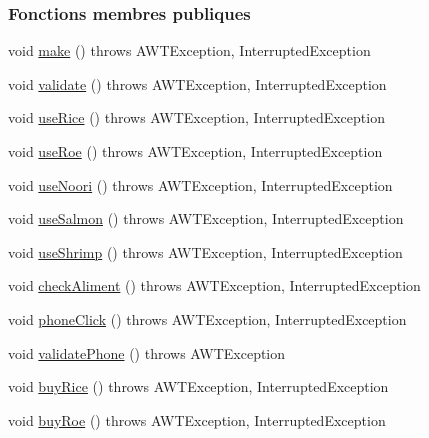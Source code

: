 \subsubsection*{Fonctions membres publiques}
\begin{DoxyCompactItemize}
\item 
void \hyperlink{classTestSushi_1_1src_1_1Suchi_1_1Salmon_a022a353afb47ca70372948b41988f10b}{make} ()  throws A\+W\+T\+Exception, Interrupted\+Exception
\item 
void \hyperlink{classTestSushi_1_1src_1_1Suchi_1_1Salmon_a391e4929873a71380ea6cdbda907190a}{validate} ()  throws A\+W\+T\+Exception, Interrupted\+Exception 
\item 
void \hyperlink{classTestSushi_1_1src_1_1Suchi_1_1Recette_a2d78a4575d1295e34210e2f77c01f3f3}{use\+Rice} ()  throws A\+W\+T\+Exception, Interrupted\+Exception
\item 
void \hyperlink{classTestSushi_1_1src_1_1Suchi_1_1Recette_a8967a205e78d02ef7c30fd435fbaa0af}{use\+Roe} ()  throws A\+W\+T\+Exception, Interrupted\+Exception
\item 
void \hyperlink{classTestSushi_1_1src_1_1Suchi_1_1Recette_a10bfe3c71750c84144203a7aa2c341ee}{use\+Noori} ()  throws A\+W\+T\+Exception, Interrupted\+Exception
\item 
void \hyperlink{classTestSushi_1_1src_1_1Suchi_1_1Recette_a87cd9338767df0e5db88e6005f1da984}{use\+Salmon} ()  throws A\+W\+T\+Exception, Interrupted\+Exception
\item 
void \hyperlink{classTestSushi_1_1src_1_1Suchi_1_1Recette_ab2c165554830ba84a392765621604d44}{use\+Shrimp} ()  throws A\+W\+T\+Exception, Interrupted\+Exception
\item 
void \hyperlink{classTestSushi_1_1src_1_1Suchi_1_1Recette_a83f9f5fb6bfe2691974a5e35386e7b8a}{check\+Aliment} ()  throws A\+W\+T\+Exception, Interrupted\+Exception
\item 
void \hyperlink{classTestSushi_1_1src_1_1Suchi_1_1Recette_ad94006ea131c2379a14c50eec870b69b}{phone\+Click} ()  throws A\+W\+T\+Exception, Interrupted\+Exception
\item 
void \hyperlink{classTestSushi_1_1src_1_1Suchi_1_1Recette_a33f0912e1212b01ea1b3787bed28f0fe}{validate\+Phone} ()  throws A\+W\+T\+Exception
\item 
void \hyperlink{classTestSushi_1_1src_1_1Suchi_1_1Recette_aa0fc4c335f6ab3f905f63a16902a6379}{buy\+Rice} ()  throws A\+W\+T\+Exception, Interrupted\+Exception
\item 
void \hyperlink{classTestSushi_1_1src_1_1Suchi_1_1Recette_ad874ba9daf68328d6b65b09e6f16003e}{buy\+Roe} ()  throws A\+W\+T\+Exception, Interrupted\+Exception

\end{DoxyCompactItemize}
